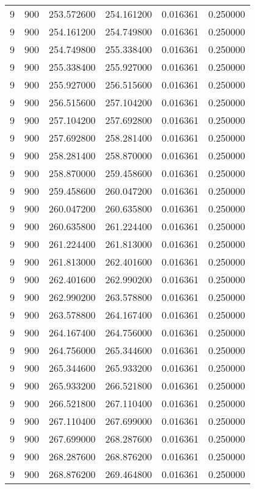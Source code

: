 \begin{longtable}{rrrrrr}
9 & 900 & 253.572600 & 254.161200 & 0.016361 & 0.250000 \\
9 & 900 & 254.161200 & 254.749800 & 0.016361 & 0.250000 \\
9 & 900 & 254.749800 & 255.338400 & 0.016361 & 0.250000 \\
9 & 900 & 255.338400 & 255.927000 & 0.016361 & 0.250000 \\
9 & 900 & 255.927000 & 256.515600 & 0.016361 & 0.250000 \\
9 & 900 & 256.515600 & 257.104200 & 0.016361 & 0.250000 \\
9 & 900 & 257.104200 & 257.692800 & 0.016361 & 0.250000 \\
9 & 900 & 257.692800 & 258.281400 & 0.016361 & 0.250000 \\
9 & 900 & 258.281400 & 258.870000 & 0.016361 & 0.250000 \\
9 & 900 & 258.870000 & 259.458600 & 0.016361 & 0.250000 \\
9 & 900 & 259.458600 & 260.047200 & 0.016361 & 0.250000 \\
9 & 900 & 260.047200 & 260.635800 & 0.016361 & 0.250000 \\
9 & 900 & 260.635800 & 261.224400 & 0.016361 & 0.250000 \\
9 & 900 & 261.224400 & 261.813000 & 0.016361 & 0.250000 \\
9 & 900 & 261.813000 & 262.401600 & 0.016361 & 0.250000 \\
9 & 900 & 262.401600 & 262.990200 & 0.016361 & 0.250000 \\
9 & 900 & 262.990200 & 263.578800 & 0.016361 & 0.250000 \\
9 & 900 & 263.578800 & 264.167400 & 0.016361 & 0.250000 \\
9 & 900 & 264.167400 & 264.756000 & 0.016361 & 0.250000 \\
9 & 900 & 264.756000 & 265.344600 & 0.016361 & 0.250000 \\
9 & 900 & 265.344600 & 265.933200 & 0.016361 & 0.250000 \\
9 & 900 & 265.933200 & 266.521800 & 0.016361 & 0.250000 \\
9 & 900 & 266.521800 & 267.110400 & 0.016361 & 0.250000 \\
9 & 900 & 267.110400 & 267.699000 & 0.016361 & 0.250000 \\
9 & 900 & 267.699000 & 268.287600 & 0.016361 & 0.250000 \\
9 & 900 & 268.287600 & 268.876200 & 0.016361 & 0.250000 \\
9 & 900 & 268.876200 & 269.464800 & 0.016361 & 0.250000 \\

\end{longtable}
